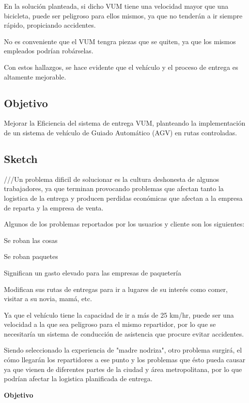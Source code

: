 \documentclass[12pt,letterpaper]{book}
\begin{document}
En la solución planteada, si dicho VUM tiene una velocidad mayor que una bicicleta, puede ser peligroso para ellos mismos, ya que no tenderán a ir siempre rápido, propiciando accidentes.

No es conveniente que el VUM tengra piezas que se quiten, ya que los mismos empleados podrían robárselas.

Con estos hallazgos, se hace evidente que el vehículo y el proceso de entrega es altamente mejorable.

\subsection{Objetivo}

Mejorar la Eficiencia del sistema de entrega VUM, planteando la implementación de un sistema de vehículo de Guiado Automático (AGV) en rutas controladas.

\subsection{Sketch}

///Un problema dificil de solucionar es la cultura deshonesta de algunos trabajadores, ya que terminan provocando problemas que afectan tanto la logistica de la entrega y producen perdidas económicas que afectan a la empresa de reparta y la empresa de venta.

Algunos de los problemas reportados por los usuarios y cliente son los siguientes:

Se roban las cosas

Se roban paquetes

Significan un gasto elevado para las empresas de paquetería

Modifican sus rutas de entregas para ir a lugares de su interés como comer, visitar a su novia, mamá, etc.

Ya que el vehículo tiene la capacidad de ir a más de 25 km/hr, puede ser una velocidad a la que sea peligroso para el mismo repartidor, por lo que se necesitaría un sistema de conducción de asistencia que procure evitar accidentes.

Siendo seleccionado la experiencia de "madre nodriza", otro problema surgirá, el cómo llegarán los repartidores a ese punto y los problemas que ésto pueda causar ya que vienen de diferentes partes de la ciudad y área metropolitana, por lo que podrían afectar la logistica planificada de entrega.

\textbf{Objetivo}
\end{document}
